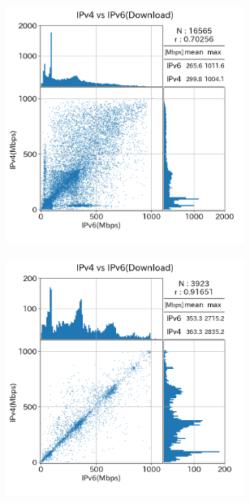 \begin{figure}[htbp]
    \begin{center}
        \begin{minipage}[t]{0.48\textwidth}
            \begin{center}
                \begin{subfigure}[b]{\textwidth}
                    \centering
                    \includegraphics[width=0.85\textwidth]{fig/new_NTT_dl.png}
                    \label{new_NTT_dl}
                    \end{subfigure}
                \begin{subfigure}[b]{\textwidth}
                    \centering
                    \includegraphics[width=0.85\textwidth]{fig/new_KDDI_dl.png}

\end{subfigure}
\end{center}
\end{minipage}
\end{center}
\end{figure}
